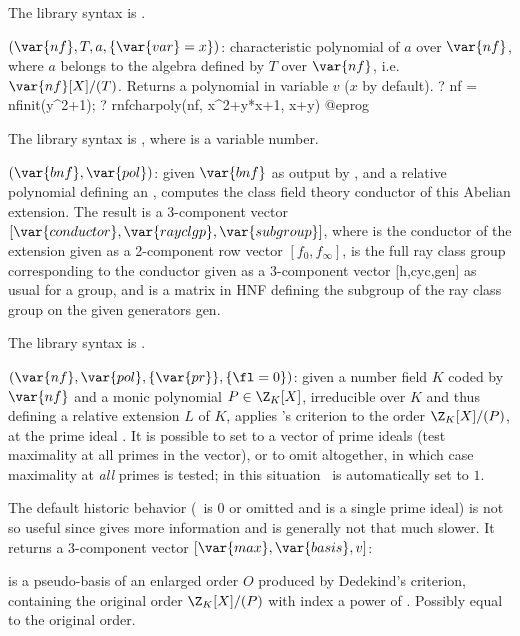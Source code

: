 The library syntax is .

$(\var{nf},T,a,\{\var{var}=x\})$: \label{se:rnfcharpoly}characteristic polynomial of
$a$ over $\var{nf}$, where $a$ belongs to the algebra defined by $T$ over
$\var{nf}$, i.e.~$\var{nf}[X]/(T)$. Returns a polynomial in variable $v$
($x$ by default).
\bprog
? nf = nfinit(y^2+1);
? rnfcharpoly(nf, x^2+y*x+1, x+y)
@eprog

The library syntax is , where  is a variable number.

$(\var{bnf},\var{pol})$: \label{se:rnfconductor}given $\var{bnf}$
as output by , and  a relative polynomial defining an
, computes the class field theory conductor of this
Abelian extension. The result is a 3-component vector
$[\var{conductor},\var{rayclgp},\var{subgroup}]$, where  is
the conductor of the extension given as a 2-component row vector
$[f_0,f_\infty]$,  is the full ray class group corresponding to
the conductor given as a 3-component vector [h,cyc,gen] as usual for a group,
and  is a matrix in HNF defining the subgroup of the ray class
group on the given generators gen.

The library syntax is .

$(\var{nf},\var{pol},\{\var{pr}\},\{\fl=0\})$: \label{se:rnfdedekind}given a number field $K$ coded by $\var{nf}$ and a monic
polynomial $P\in \Z_K[X]$, irreducible over $K$ and thus defining a relative
extension $L$ of $K$, applies 's criterion to the order
$\Z_K[X]/(P)$, at the prime ideal . It is possible to set 
to a vector of prime ideals (test maximality at all primes in the vector),
or to omit altogether, in which case maximality at \emph{all} primes is tested;
in this situation \fl\ is automatically set to $1$.

The default historic behavior (\fl\ is 0 or omitted and  is a
single prime ideal) is not so useful since
 gives more information and is generally not that
much slower. It returns a 3-component vector $[\var{max}, \var{basis}, v]$:

\item {} is a pseudo-basis of an enlarged order $O$ produced by
Dedekind's criterion, containing the original order $\Z_K[X]/(P)$
with index a power of . Possibly equal to the original order.


